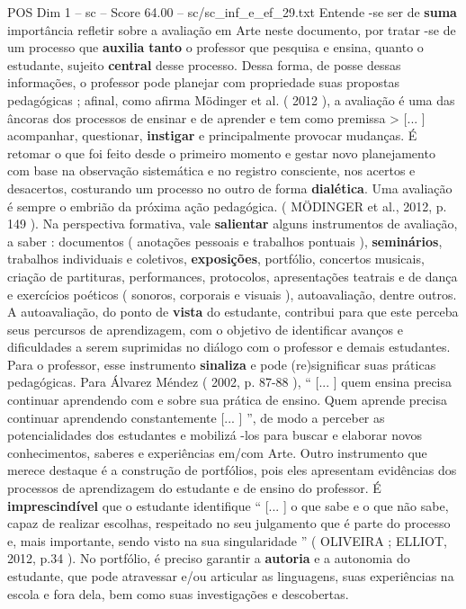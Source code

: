 \begin{textsample}{POS Dim 1 – sc – Score 64.00 – sc/sc\_inf\_e\_ef\_29.txt}
Entende -se ser de \textbf{suma} importância refletir sobre a avaliação em Arte neste documento, por tratar -se de um processo que \textbf{auxilia} \textbf{tanto} o professor que pesquisa e ensina, quanto o estudante, sujeito \textbf{central} desse processo.
Dessa forma, de posse dessas informações, o professor pode planejar com propriedade suas propostas pedagógicas ; afinal, como afirma Mödinger et al. ( 2012 ), a avaliação é uma das âncoras dos processos de ensinar e de aprender e tem como premissa > [... ] acompanhar, questionar, \textbf{instigar} e principalmente provocar mudanças.
É retomar o que foi feito desde o primeiro momento e gestar novo planejamento com base na observação sistemática e no registro consciente, nos acertos e desacertos, costurando um processo no outro de forma \textbf{dialética}.
Uma avaliação é sempre o embrião da próxima ação pedagógica. ( MÖDINGER et al., 2012, p. 149 ).
Na perspectiva formativa, vale \textbf{salientar} alguns instrumentos de avaliação, a saber : documentos ( anotações pessoais e trabalhos pontuais ), \textbf{seminários}, trabalhos individuais e coletivos, \textbf{exposições}, portfólio, concertos musicais, criação de partituras, performances, protocolos, apresentações teatrais e de dança e exercícios poéticos ( sonoros, corporais e visuais ), autoavaliação, dentre outros.
A autoavaliação, do ponto de \textbf{vista} do estudante, contribui para que este perceba seus percursos de aprendizagem, com o objetivo de identificar avanços e dificuldades a serem suprimidas no diálogo com o professor e demais estudantes.
Para o professor, esse instrumento \textbf{sinaliza} e pode (re)significar suas práticas pedagógicas.
Para Álvarez Méndez ( 2002, p. 87-88 ), “ [... ] quem ensina precisa continuar aprendendo com e sobre sua prática de ensino.
Quem aprende precisa continuar aprendendo constantemente [... ] ”, de modo a perceber as potencialidades dos estudantes e mobilizá -los para buscar e elaborar novos conhecimentos, saberes e experiências em/com Arte.
Outro instrumento que merece destaque é a construção de portfólios, pois eles apresentam evidências dos processos de aprendizagem do estudante e de ensino do professor.
É \textbf{imprescindível} que o estudante identifique “ [... ] o que sabe e o que não sabe, capaz de realizar escolhas, respeitado no seu julgamento que é parte do processo e, mais importante, sendo visto na sua singularidade ” ( OLIVEIRA ; ELLIOT, 2012, p.34 ).
No portfólio, é preciso garantir a \textbf{autoria} e a autonomia do estudante, que pode atravessar e/ou articular as linguagens, suas experiências na escola e fora dela, bem como suas investigações e descobertas.

\end{textsample}
